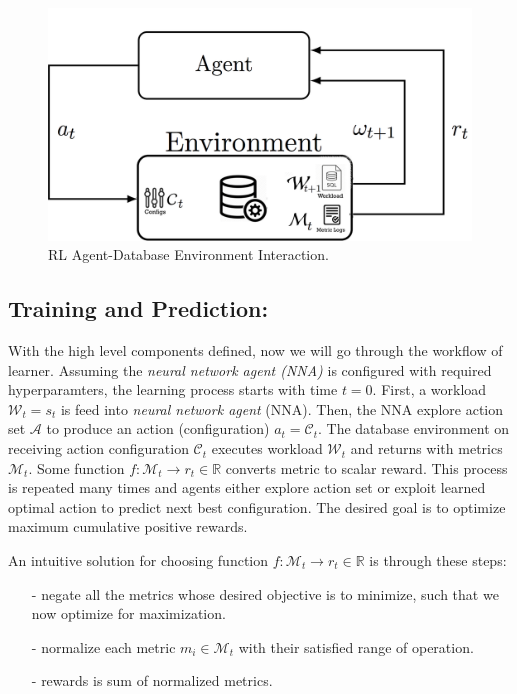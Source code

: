 \begin{figure}[h]
  \vspace{-3mm}
	\includegraphics[width=\linewidth ]{fig/database_agent.png}
    \vspace{-5mm}
    \caption{RL Agent-Database Environment Interaction.}
    \label{fig:database_agent}
    \vspace{-5mm}
\end{figure}


\subsection*{Training and Prediction:}
With the high level components defined, now we will go through the workflow of learner.
Assuming the {\em neural network agent (NNA) } is configured with required hyperparamters, the learning process starts with time $t=0$.
First, a workload $\mathcal{W}_t = s_t$  is feed into {\em neural network agent} (NNA). Then, the NNA explore action set $\mathcal{A}$ to produce an action (configuration) $a_t = \mathcal{C}_t$. The database environment on receiving action configuration $\mathcal{C}_t$ executes workload $\mathcal{W}_t$ and returns with metrics $\mathcal{M}_t$. Some function $f: \mathcal{M}_t \rightarrow r_t \in \mathbb{R}$ converts metric to scalar reward. This process is repeated many times and agents either explore action set or exploit learned optimal action to predict next best configuration. The desired goal is to optimize maximum cumulative positive rewards.

An intuitive solution for choosing function $f: \mathcal{M}_t \rightarrow r_t \in \mathbb{R}$ is  through these steps:\\
\vspace{-4mm}
\begin{itemize}
  \item[-] negate all the metrics whose desired objective is to minimize, such that we now optimize for maximization.
  \item[-] normalize each metric $m_i \in \mathcal{M}_t$ with their satisfied range of operation.
  \item[-] rewards is sum  of normalized metrics.
\end{itemize}

